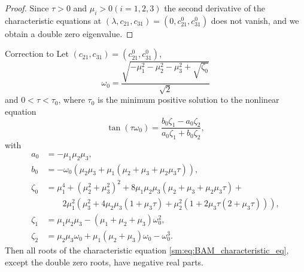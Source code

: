 \begin{proof}
Since $\tau>0$ and $\mu_{i}>0 (i=1,2,3)$ the second derivative of
the characteristic equations at $(\lambda,c_{21},c_{31})=(0,c_{21}^{0},c_{31}^{0})$
does not vanish, and we obtain a double zero eigenvalue.
\end{proof}

\begin{lemma}
\label{sm:lemma:triNeuralBAMNetworkModelEigenvalues}
\textup{Correction to \cite[Lemma 3]{dong2013bogdanov}}
Let $(c_{21},c_{31})=(c_{21}^{0},c_{31}^{0})$,
\begin{equation}
    \label{sm:eq:triNeuralBAMNetworkModel:omega_0} 
    \omega_0 = \frac{\sqrt{-\mu_1^2 - \mu_2^2 - \mu_3^2 + \sqrt{\zeta_0}}}{\sqrt{2}}
\end{equation}
and $0<\tau<\tau_{0}$, where $\tau_0$ is the minimum positive solution to the nonlinear equation
\begin{equation}
    \label{sm:eq:triNeuralBAMNetworkModel:tan} 
    \tan (\tau \omega_0) = \frac{b_0\zeta_1 - a_0\zeta_2}{a_0\zeta_1 + b_0\zeta_2},
\end{equation}
with
\begin{align*}
a_0 &= -\mu_1\mu_2\mu_3, \\ 
b_0 &= -\omega_0(\mu_2\mu_3 + \mu_1(\mu_2 + \mu_3 + \mu_2\mu_3\tau)), \\
\zeta_0 &= \mu_1^4 + (\mu_2^2 + \mu_3^2)^2 + 8\mu_1\mu_2\mu_3(\mu_2 + \mu_3 + \mu_2\mu_3\tau) + \\
        &\qquad 2\mu_1^2(\mu_3^2 + 4\mu_2\mu_3(1 + \mu_3\tau) + \mu_2^2(1 + 2\mu_3\tau(2 + \mu_3\tau))), \\
\zeta_1 &= \mu_1\mu_2\mu_3 - (\mu_1 + \mu_2 + \mu_3)\omega_0^2, \\
\zeta_2 &= \mu_2\mu_3\omega_0 + \mu_1(\mu_2 + \mu_3)\omega_0 - \omega_0^3.
\end{align*}
Then all roots of the characteristic equation \cref{sm:eq:BAM_characteristic_eq},
except the double zero roots, have negative real parts.
\end{lemma}

